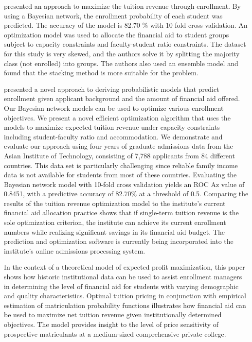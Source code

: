 \documentclass[12pt,english]{report}
\begin{document}
\citet{Thanh2007} presented an approach to maximize the tuition revenue through
enrollment. By using a Bayesian network, the enrollment probability of each
student was predicted. The accuracy of the model is 82.70 $\%$ with 10-fold
cross validation. An optimization model was used to allocate the financial aid
to
student groups subject to capacity constraints and faculty-student ratio
constraints. The dataset for this study is very skewed, and the authors solve
it by splitting the majority class (not enrolled) into groups. The authors also
used an ensemble model and found that the stacking method is more suitable for
the problem.

\citet{Thanh2007}  presented a novel approach to deriving probabilistic models
that predict enrollment given applicant background and the amount of financial
aid offered. Our Bayesian network models can be used to optimize various
enrollment objectives. We present a novel efficient optimization algorithm that
uses the models to maximize expected tuition revenue under capacity constraints
including student-faculty ratio and accommodation. We demonstrate and evaluate
our approach using four years of graduate admissions data from the Asian
Institute of Technology, consisting of 7,788 applicants from 84 different
countries. This data set is particularly challenging since reliable family
income data is not available for students from most of these countries.
Evaluating the Bayesian network model with 10-fold cross validation yields an
ROC Az value of 0.8451, with a predictive accuracy of 82.70\% at a threshold of
0.5. Comparing the results of the tuition revenue optimization model to the
institute's current financial aid allocation practice shows that if single-term
tuition revenue is the sole optimization criterion, the institute can achieve
its current enrollment numbers while realizing significant savings in its
financial aid budget. The prediction and optimization software is currently
being incorporated into the institute's online admissions processing system.

\citet{Bosshardt2010} In the context of a theoretical model of expected profit
maximization, this paper shows how historic institutional data can be used to
assist enrollment managers in determining the level of financial aid for
students with varying demographic and quality characteristics. Optimal tuition
pricing in conjunction with empirical estimation of matriculation probability
functions illustrates how financial aid can be used to maximize net tuition
revenue given institutionally determined objectives. The model provides insight
to the level of price sensitivity of prospective matriculants at a medium-sized
comprehensive private college.
\end{document}
